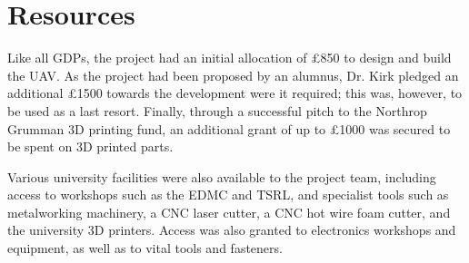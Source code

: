 \documentclass[../../main.tex]{subfiles}
\begin{document}
\section{Resources} \label{sec:introduction:resources}

Like all GDPs, the project had an initial allocation of £850 to design and build the UAV.
As the project had been proposed by an alumnus, Dr. Kirk pledged an additional £1500 towards the development were it required; this was, however, to be used as a last resort.
Finally, through a successful pitch to the Northrop Grumman 3D printing fund, an additional grant of up to £1000 was secured to be spent on 3D printed parts. 

Various university facilities were also available to the project team, including access to workshops such as the EDMC and TSRL, and specialist tools such as metalworking machinery, a CNC laser cutter, a CNC hot wire foam cutter, and the university 3D printers.
Access was also granted to electronics workshops and equipment, as well as to vital tools and fasteners.
\end{document}
